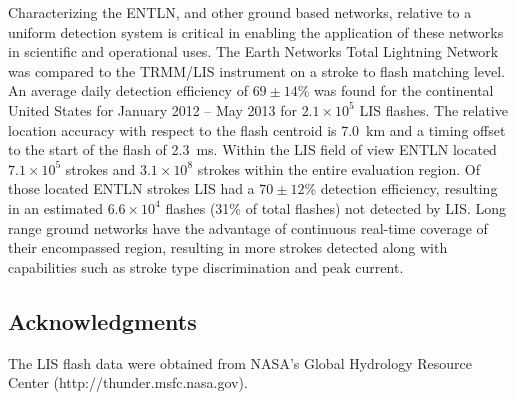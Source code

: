 Characterizing the ENTLN, and other ground based networks, relative to a uniform detection system is critical in enabling the application of these networks in scientific and operational uses.
The Earth Networks Total Lightning Network was compared to the TRMM/LIS instrument on a stroke to flash matching level.
An average daily detection efficiency of $69\pm 14$\% was found for the continental United States for January 2012 -- May 2013 for $2.1 \times 10^5$ LIS flashes.
The relative location accuracy with respect to the flash centroid is 7.0~km and a timing offset to the start of the flash of 2.3~ms.
Within the LIS field of view ENTLN located $7.1\times 10^5$ strokes and $3.1\times10^8$ strokes within the entire evaluation region.
Of those located ENTLN strokes LIS had a $70 \pm 12$\% detection efficiency, resulting in an estimated $6.6 \times 10^4$ flashes (31\% of total flashes) not detected by LIS.
Long range ground networks have the advantage of continuous real-time coverage of their encompassed region, resulting in more strokes detected along with capabilities such as stroke type discrimination and peak current.

\subsection*{Acknowledgments}

The LIS flash data were obtained from NASA's Global Hydrology Resource Center (http://thunder.msfc.nasa.gov).
